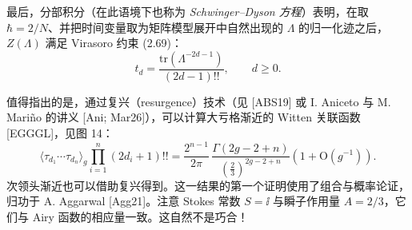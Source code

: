 最后，分部积分（在此语境下也称为 \emph{Schwinger--Dyson 方程}）表明，在取 $\hbar=2/N$、并把时间变量取为矩阵模型展开中自然出现的 $\Lambda$ 的归一化迹之后，$Z(\Lambda)$ 满足 Virasoro 约束 (2.69)：
\begin{equation}
t_d=\frac{\mathrm{tr}(\Lambda^{-2d-1})}{(2d-1)!!},\qquad d\ge0. \tag{2.78}
\end{equation}

值得指出的是，通过复兴（resurgence）技术（见 [ABS19] 或 I. Aniceto 与 M. Mariño 的讲义 [Ani; Mar26]），可以计算大亏格渐近的 Witten 关联函数 [EGGGL]，见图 14：
\begin{equation}
\langle\tau_{d_1}\cdots\tau_{d_n}\rangle_g\prod_{i=1}^{n}(2d_i+1)!!=\frac{2^{n-1}}{2\pi}\,\frac{\Gamma(2g-2+n)}{\left(\frac{2}{3}\right)^{2g-2+n}}\left(1+\mathrm{O}(g^{-1})\right). \tag{2.79}
\end{equation}
次领头渐近也可以借助复兴得到。这一结果的第一个证明使用了组合与概率论证，归功于 A. Aggarwal [Agg21]。注意 Stokes 常数 $S=\ii$ 与瞬子作用量 $A=2/3$，它们与 Airy 函数的相应量一致。这自然不是巧合！
